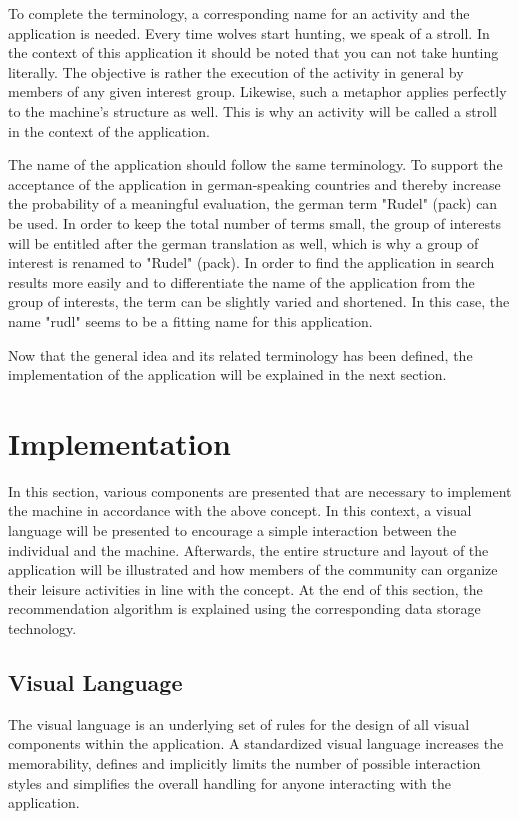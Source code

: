 \documentclass[12pt,numbers=noenddot,parskip,bibliography=totocnumbered,listof=totocnumbered]{scrreprt}
\begin{document}
To complete the terminology, a corresponding name for an activity and the application is needed. Every time wolves start hunting, we speak of a stroll. In the context of this application it should be noted that you can not take hunting literally. The objective is rather the execution of the activity in general by members of any given interest group. Likewise, such a metaphor applies perfectly to the machine's structure as well. This is why an activity will be called a stroll in the context of the application.

The name of the application should follow the same terminology. To support the acceptance of the application in german-speaking countries and thereby increase the probability of a meaningful evaluation, the german term "Rudel" (pack) can be used. In order to keep the total number of terms small, the group of interests will be entitled after the german translation as well, which is why a group of interest is renamed to "Rudel" (pack). In order to find the application in search results more easily and to differentiate the name of the application from the group of interests, the term can be slightly varied and shortened. In this case, the name "rudl" seems to be a fitting name for this application.

Now that the general idea and its related terminology has been defined, the implementation of the application will be explained in the next section.

\section{Implementation}
In this section, various components are presented that are necessary to implement the machine in accordance with the above concept. In this context, a visual language will be presented to encourage a simple interaction between the individual and the machine. Afterwards, the entire structure and layout of the application will be illustrated and how members of the community can organize their leisure activities in line with the concept. At the end of this section, the recommendation algorithm is explained using the corresponding data storage technology.

\subsection{Visual Language} 
The visual language is an underlying set of rules for the design of all visual components within the application. A standardized visual language increases the memorability, defines and implicitly limits the number of possible interaction styles and simplifies the overall handling for anyone interacting with the application.
\end{document}
